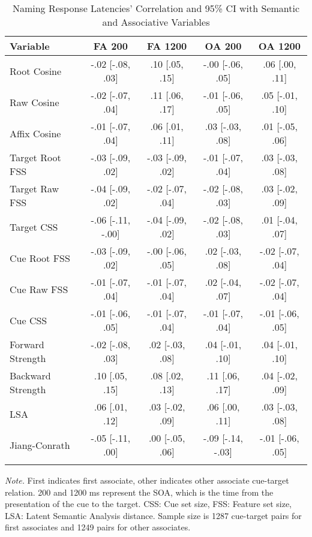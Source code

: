 \documentclass[english,,man]{apa6}
\theoremstyle{definition}
\theoremstyle{definition}
\theoremstyle{definition}
\theoremstyle{remark}
\begin{document}
\begin{table}[tbp]
\begin{center}
\begin{threeparttable}
\caption{\label{tab:name-table}Naming Response Latencies' Correlation and 95\% CI with Semantic and Associative Variables}
\small{
\begin{tabular}{lcccc}
\toprule
Variable & \multicolumn{1}{c}{FA 200} & \multicolumn{1}{c}{FA 1200} & \multicolumn{1}{c}{OA 200} & \multicolumn{1}{c}{OA 1200}\\
\midrule
Root Cosine & -.02 [-.08, .03] & .10 [.05, .15] & -.00 [-.06, .05] & .06 [.00, .11]\\
Raw Cosine & -.02 [-.07, .04] & .11 [.06, .17] & -.01 [-.06, .05] & .05 [-.01, .10]\\
Affix Cosine & -.01 [-.07, .04] & .06 [.01, .11] & .03 [-.03, .08] & .01 [-.05, .06]\\
Target Root FSS & -.03 [-.09, .02] & -.03 [-.09, .02] & -.01 [-.07, .04] & .03 [-.03, .08]\\
Target Raw FSS & -.04 [-.09, .02] & -.02 [-.07, .04] & -.02 [-.08, .03] & .03 [-.02, .09]\\
Target CSS & -.06 [-.11, -.00] & -.04 [-.09, .02] & -.02 [-.08, .03] & .01 [-.04, .07]\\
Cue Root FSS & -.03 [-.09, .02] & -.00 [-.06, .05] & .02 [-.03, .08] & -.02 [-.07, .04]\\
Cue Raw FSS & -.01 [-.07, .04] & -.01 [-.07, .04] & .02 [-.04, .07] & -.02 [-.07, .04]\\
Cue CSS & -.01 [-.06, .05] & -.01 [-.07, .04] & -.01 [-.07, .04] & -.01 [-.06, .05]\\
Forward Strength & -.02 [-.08, .03] & .02 [-.03, .08] & .04 [-.01, .10] & .04 [-.01, .10]\\
Backward Strength & .10 [.05, .15] & .08 [.02, .13] & .11 [.06, .17] & .04 [-.02, .09]\\
LSA & .06 [.01, .12] & .03 [-.02, .09] & .06 [.00, .11] & .03 [-.03, .08]\\
Jiang-Conrath & -.05 [-.11, .00] & .00 [-.05, .06] & -.09 [-.14, -.03] & -.01 [-.06, .05]\\
\bottomrule
\addlinespace
\end{tabular}
}
\begin{tablenotes}[para]
\normalsize{\textit{Note.} First indicates first associate, other indicates other associate cue-target relation. 200 and 1200 ms represent the SOA, which is the time from the presentation of the cue to the target. CSS: Cue set size, FSS: Feature set size, LSA: Latent Semantic Analysis distance. Sample size is 1287 cue-target pairs for first associates and 1249 pairs for other associates.}
\end{tablenotes}
\end{threeparttable}
\end{center}
\end{table}
\end{document}
